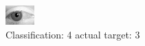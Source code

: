 \begin{figure}[h!]
\begin{center}
\includegraphics[width=0.60\columnwidth]{figures/ID2807_class_4_target_3.png}
\end{center}
\caption{ Classification: 4 actual target: 3}
\label{fig:ID2807_class_4_target_3}
\end{figure}
